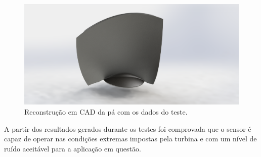 \begin{figure}[h!]
\centering
	\includegraphics[width=0.9\columnwidth]{figs/3dsensors/Pa_Real_Render_04}
	\caption{Reconstrução em CAD da pá com os dados do teste.}
	\label{fig::turbina_cad}
\end{figure}

A partir dos resultados gerados durante os testes foi comprovada que o sensor é
capaz de operar nas condições extremas impostas pela turbina e com um nível de
ruído aceitável para a aplicação em questão. 
